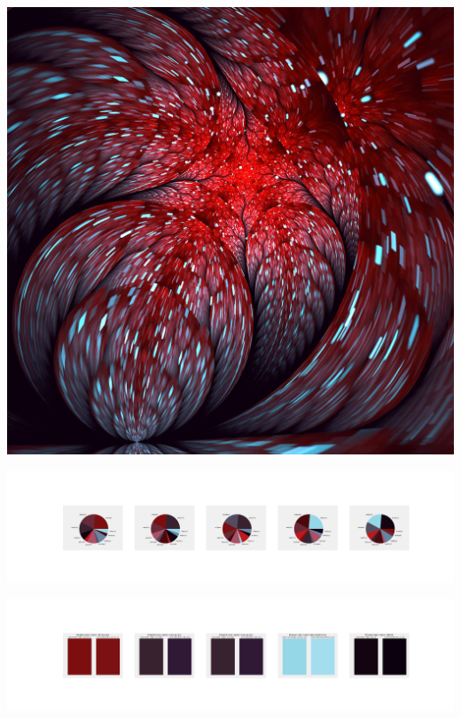 \documentclass[11pt]{article}
\begin{document}
\begin{landscape}
    \begin{center}
    \includegraphics[width=\textwidth]{./nbimg/file (280).jpg}
    \end{center}

    \begin{center}
    \includegraphics[width=250mm]{./nbimg/pie-201.jpg}
    \end{center}

    \begin{center}
    \includegraphics[width=250mm]{./nbimg/peak-201.jpg}
    \end{center}
    


\end{landscape}
\end{document}
